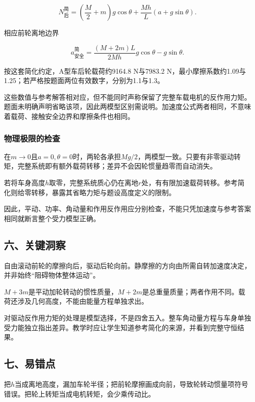 \documentclass[12pt,a4paper,fontset=fandol]{ctexart}
\begin{document}
\[
\boxed{
N_{\text{后}}^{\text{简}}
=\left(\frac M2+m\right)g\cos\theta
+\frac{Mh}L(a+g\sin\theta)}.
\]

相应前轮离地边界

\[
a_{\text{安全}}^{\text{简}}
=\frac{(M+2m)L}{2Mh}g\cos\theta-g\sin\theta.
\]

按这套简化约定，A型车后轮载荷约9164.8 N与7983.2
N，最小摩擦系数约1.09与1.25；若严格按题面两位有效数字，分别为1.1与1.3。

这些数值与参考解答相对应，但不能同时声称保留了完整车载电机的反作用力矩。题面未明确声明省略该项，因此两模型区别需说明。加速度公式两者相同，不意味着载荷、接触安全边界和摩擦条件也相同。

\subsubsection{物理极限的检查}\label{ux7269ux7406ux6781ux9650ux7684ux68c0ux67e5}

在\(m\to0\)且\(a=0,\theta=0\)时，两轮各承担\(Mg/2\)，两模型一致。只要有非零驱动转矩，完整系统即有额外载荷转移；差异不会因轮惯量趋零而自动消失。

若将车身高度\(h\)取零，完整系统质心仍在离地\(r\)处，有有限加速载荷转移。参考简化则给零转移，暴露其省略力矩与题设高度定义的限制。

因此，平动、功率、角动量和作用反作用应分别检查，不能只凭加速度与参考答案相同就断言整个受力模型正确。

\subsection{六、关键洞察}\label{ux516dux5173ux952eux6d1eux5bdf-6}

自由滚动前轮的摩擦向后，驱动后轮向前。静摩擦的方向由所需自转加速度决定，并非始终``阻碍物体整体运动''。

\(M+3m\)是平动加轮转动的惯性质量，\(M+2m\)是总重量质量；两者作用不同。载荷还涉及几何高度，不能由能量方程单独求出。

对驱动反作用力矩的处理是模型选择，不是四舍五入。整车角动量方程与车身单独受力能独立指出差异。教学时应让学生知道参考简化的来源，并看到完整守恒结果。

\subsection{七、易错点}\label{ux4e03ux6613ux9519ux70b9-6}

把\(h\)当成离地高度，漏加车轮半径；把前轮摩擦画成向前，导致轮转动惯量项符号错误。把轮上转矩当成电机转矩，会少乘传动比。
\end{document}
